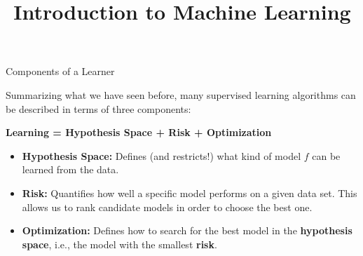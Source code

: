 \documentclass[11pt,compress,t,notes=noshow, xcolor=table]{beamer}
\title{Introduction to Machine Learning}
\institute{\href{https://compstat-lmu.github.io/lecture_i2ml/}{compstat-lmu.github.io/lecture\_i2ml}}
\date{}
\begin{document}









\begin{vbframe}{Components of a Learner}

Summarizing what we have seen before, many supervised learning algorithms 
can be described in terms of three components:

\lz

\begin{center}

  \textbf{Learning = Hypothesis Space + Risk + Optimization}
  
\end{center}

\lz

\begin{itemize}

  \item \textbf{Hypothesis Space:} Defines (and restricts!) what kind of model 
  $f$ can be learned from the data.
  
  \item \textbf{Risk:} Quantifies how well a specific model performs on a given 
  data set. This allows us to rank candidate models in order to choose the best one.
  
  \item \textbf{Optimization:} Defines how to search for the best model in the 
  \textbf{hypothesis space}, i.e., the model with the smallest \textbf{risk}.
  
\end{itemize}

\end{vbframe}

\end{document}
